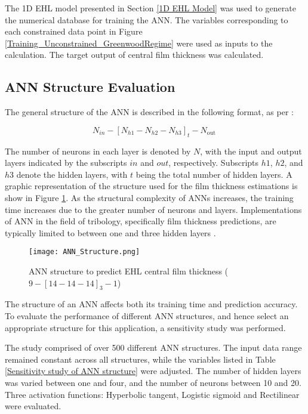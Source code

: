 The 1D EHL model presented in Section \ref{1D EHL Model} was used to generate the numerical database for training the ANN. The variables corresponding to each constrained data point in Figure \ref{Training_Unconstrained_GreenwoodRegime} were used as inputs to the calculation. The target output of central film thickness was calculated.

\subsection{ANN Structure Evaluation}

The general structure of the ANN is described in the following format, as per \cite{Zhang2002}:

\begin{equation}
	N_{i n}-\left[N_{h 1}-N_{h 2}-N_{h 3}\right]_t-N_{\text {out }}
\end{equation}

The number of neurons in each layer is denoted by $N$, with the input and output layers indicated by the subscripts $in$ and $out$, respectively. Subscripts $h1$, $h2$, and $h3$ denote the hidden layers, with $t$ being the total number of hidden layers. A graphic representation of the structure used for the film thickness estimations is show in Figure \ref{ANN structure}. As the structural complexity of ANNs increases, the training time increases due to the greater number of neurons and layers. Implementations of ANN in the field of tribology, specifically film thickness predictions, are typically limited to between one and three hidden layers \cite{Marian2021}.

\begin{figure}
	\centering  
	\texttt{[image: ANN\_Structure.png]}
	\caption{ANN structure to predict EHL central film thickness ($9-[14-14-14]_3-1$)}
	\label{ANN structure}
\end{figure} 

The structure of an ANN affects both its training time and prediction accuracy. To evaluate the performance of different ANN structures, and hence select an appropriate structure for this application, a sensitivity study was performed.

The study comprised of over 500 different ANN structures. The input data range remained constant across all structures, while the variables listed in Table \ref{Sensitivity study of ANN structure} were adjusted. The number of hidden layers was varied between one and four, and the number of neurons between 10 and 20. Three activation functions: Hyperbolic tangent, Logistic sigmoid and Rectilinear were evaluated.

